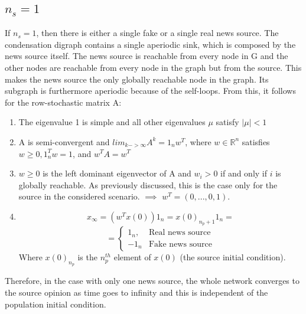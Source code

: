 \subsection{$n_s = 1$}
If $n_s=1$, then there is either a single fake or a single real news source. The condensation digraph contains a single aperiodic sink, which is composed by the news source itself. The news source is reachable from every node in G and the other nodes are reachable from every node in the graph but from the source. This makes the news source the only globally reachable node in the graph. Its subgraph is furthermore aperiodic because of the self-loops. From this, it follows for the row-stochastic matrix A:
\begin{enumerate}
	\item
	The eigenvalue 1 is simple and all other eigenvalues $\mu$ satisfy $|\mu|<1$
	\item
	A is semi-convergent and $lim_{k->\infty} A^k = 1_n w^T$, where $w \in \mathbb{R}^n$ satisfies $w\geq0, 1_n^T w = 1$, and $w^TA=w^T$
	\item
	$w\geq0$ is the left dominant eigenvector of A and $w_i>0$ if and only if $i$ is globally reachable. As previously discussed, this is the case only for the source in the considered scenario. \newline
	$\implies$ $w^T = (0,...,0,1)$.
	\item
	$$x_\infty = (w^T x(0))1_n = x(0)_{n_p+1} 1_n=$$
	$$= \begin{cases}
	1_n,& \text{Real news source}\\
	-1_n & \text{Fake news source}
	\end{cases}$$
	Where $x(0)_{n_p}$ is the $n_p^{th}$ element of $x(0)$ (the source initial condition). 
\end{enumerate}
Therefore, in the case with only one news source, the whole network converges to the source opinion as time goes to infinity and this is independent of the population initial condition.




